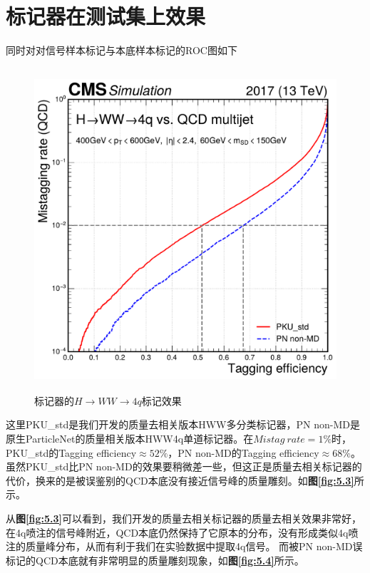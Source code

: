 \section{标记器在测试集上效果}
同时对对信号样本标记与本底样本标记的ROC图如下
\begin{figure}[H]\label{fig:5.2}
 \centering
 \caption{标记器的$H\to WW\to 4q$标记效果}
 \includegraphics[height=12cm, width=12cm]{pictures/ROC_HWW_4q.pdf}
\end{figure}
这里PKU\_std是我们开发的质量去相关版本HWW多分类标记器，PN non-MD是原生ParticleNet的质量相关版本HWW4q单道标记器。在$Mistag\ rate=1\%$时，PKU\_std的Tagging efficiency$\approx52\%$，PN non-MD的Tagging efficiency$\approx68\%$。虽然PKU\_std比PN non-MD的效果要稍微差一些，但这正是质量去相关标记器的代价，换来的是被误鉴别的QCD本底没有接近信号峰的质量雕刻。如\textbf{图\ref{fig:5.3}}所示。

从\textbf{图\ref{fig:5.3}}可以看到，我们开发的质量去相关标记器的质量去相关效果非常好，在4q喷注的信号峰附近，QCD本底仍然保持了它原本的分布，没有形成类似4q喷注的质量峰分布，从而有利于我们在实验数据中提取4q信号。
而被PN non-MD误标记的QCD本底就有非常明显的质量雕刻现象，如\textbf{图\ref{fig:5.4}}所示。

